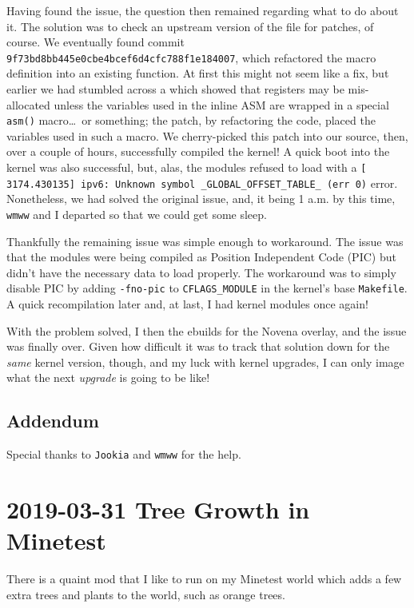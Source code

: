 \documentclass{article}
\begin{document}
Having found the issue, the question then remained regarding what to do about it.  The solution was to check an upstream version of the file for patches, of course.  We eventually found commit \texttt{9f73bd8bb445e0cbe4bcef6d4cfc788f1e184007}, which refactored the macro definition into an existing function.  At first this might not seem like a fix, but earlier we had stumbled across a  which showed that registers may be mis-allocated unless the variables used in the inline ASM are wrapped in a special \texttt{asm()} macro\ldots~or something; the patch, by refactoring the code, placed the variables used in such a macro.  We cherry-picked this patch into our source, then, over a couple of hours, successfully compiled the kernel!  A quick boot into the kernel was also successful, but, alas, the modules refused to load with a \verb|[ 3174.430135] ipv6: Unknown symbol _GLOBAL_OFFSET_TABLE_ (err 0)| error.  Nonetheless, we had solved the original issue, and, it being 1 a.m. by this time, \texttt{wmww} and I departed so that we could get some sleep.

Thankfully the remaining issue was simple enough to workaround.  The issue was that the modules were being compiled as Position Independent Code (PIC) but didn't have the necessary data to load properly.  The workaround was to simply disable PIC by adding \texttt{-fno-pic} to \texttt{CFLAGS_MODULE} in the kernel's base \texttt{Makefile}.  A quick recompilation later and, at last, I had kernel modules once again!

With the problem solved, I then  the ebuilds for the Novena overlay, and the issue was finally over.  Given how difficult it was to track that solution down for the \emph{same} kernel version, though, and my luck with kernel upgrades, I can only image what the next \emph{upgrade} is going to be like!

\subsection{Addendum}
Special thanks to \texttt{Jookia} and \texttt{wmww} for the help.


\section{2019-03-31 Tree Growth in Minetest}
There\label{2019-03-31-minetest-tree-growth} is a quaint mod that I like to run on my Minetest world which adds a few extra trees and plants to the world, such as orange trees.
\end{document}
